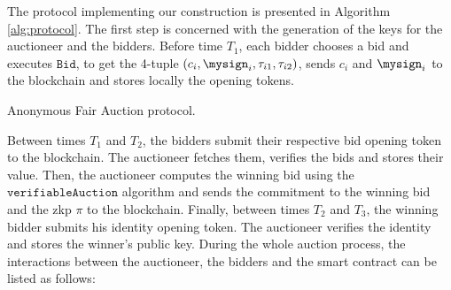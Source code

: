 	The protocol implementing our construction is presented in Algorithm \ref{alg:protocol}. The first step is concerned with the generation of the keys for the auctioneer and the bidders. Before time $T_1$, each bidder chooses a bid and executes $\mathtt{Bid}$, to get the 4-tuple $(c_i, \mysign_i, \tau_{i1}, \tau_{i2})$, sends $c_i$ and $\mysign_i$ to the blockchain and stores locally the opening tokens.
	
	\begin{algorithm}%
	  \DontPrintSemicolon%
	  \caption{Anonymous Fair Auction protocol.}%
	  \label{alg:protocol}%
	\end{algorithm}%

	Between times $T_1$ and $T_2$, the bidders submit their respective bid opening token to the blockchain. The auctioneer fetches them, verifies the bids and stores their value. Then, the auctioneer computes the winning bid using the $\mathtt{verifiableAuction}$ algorithm and sends the commitment to the winning bid and the \gls{zkp} $\pi$ to the blockchain.  Finally, between times $T_2$ and $T_3$, the winning bidder submits his identity opening token. The auctioneer verifies the identity and stores the winner's public key.  During the whole auction process, the interactions between the auctioneer, the bidders and the smart contract can be listed as follows:
	
